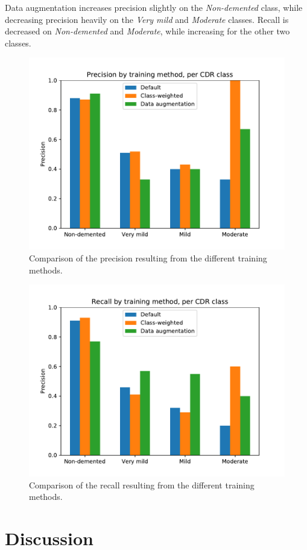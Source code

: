 \documentclass{kththesis}
\begin{document}
Data augmentation increases precision slightly on the \textit{Non-demented} class, while decreasing precision heavily on the \textit{Very mild} and \textit{Moderate} classes. Recall is decreased on \textit{Non-demented} and \textit{Moderate}, while increasing for the other two classes.

\begin{figure}[H]
  \centering
  \includegraphics[width=0.8\linewidth]{img/precision_comparison.pdf}
  \caption{Comparison of the precision resulting from the different training methods.} \label{fig:precision_comparison}
\end{figure}
\begin{figure}[H]
  \centering
  \includegraphics[width=0.8\linewidth]{img/recall_comparison.pdf}
  \caption{Comparison of the recall resulting from the different training methods.} \label{fig:recall_comparison}
\end{figure}

\chapter{Discussion}
\end{document}
